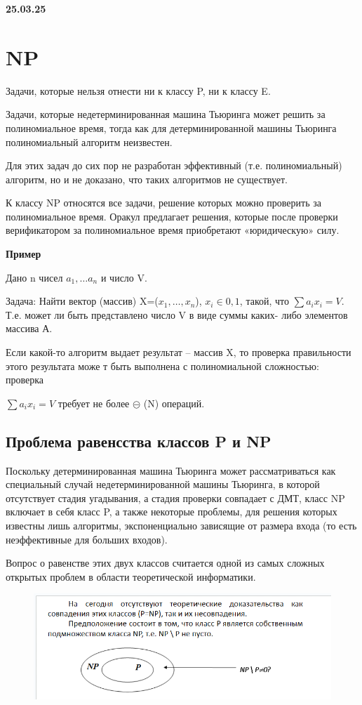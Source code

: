 \documentclass{article}
\begin{document}
\textbf{25.03.25}

\section{NP}
Задачи, которые нельзя отнести ни к классу P, ни к классу E.

Задачи, которые недетерминированная машина Тьюринга может решить
 за полиномиальное время, тогда как для детерминированной машины Тьюринга
  полиномиальный алгоритм неизвестен.

Для этих задач до сих пор не разработан эффективный
 (т.е. полиномиальный) алгоритм, но и не доказано,
  что таких алгоритмов не существует.

К классу NP относятся все задачи, решение которых можно проверить 
за полиномиальное время. 
Оракул предлагает решения, которые после проверки верификатором 
за полиномиальное время приобретают «юридическую» силу.

\textbf{Пример}

Дано n чисел $a_1,…a_n$ и число V.

Задача: Найти вектор (массив) X=($x_1,…,x_n$), $x_i\in{0,1}$, такой, что $\sum a_ix_i = V$.
Т.е. может ли быть представлено число V в виде
 суммы каких- либо элементов массива А.

Если какой-то алгоритм выдает результат – массив
 X, то проверка правильности этого результата може
 т быть выполнена с полиномиальной сложностью: проверка

$\sum a_ix_i = V$ требует не более $\circleddash $ (N) операций.

\subsection{Проблема равенсства классов P и NP}


Поскольку детерминированная машина Тьюринга может рассматриваться
 как специальный случай недетерминированной машины Тьюринга,
  в которой отсутствует стадия угадывания, 
  а стадия проверки совпадает с ДМТ, класс NP включает в себя класс P,
   а также некоторые проблемы, для решения которых известны лишь алгоритмы, 
   экспоненциально зависящие от размера входа 
   (то есть неэффективные для больших входов).

Вопрос о равенстве этих двух классов
 считается одной из самых сложных открытых проблем
  в области теоретической информатики.

  \begin{figure} [H]
    \includegraphics[width=1\linewidth]{Снимок экрана 2025-03-25 093755.png}
\end{figure}
\end{document}
